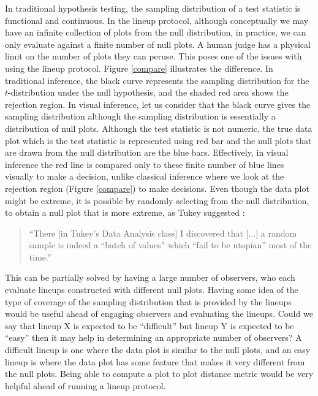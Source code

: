 \documentclass[12]{article}
\begin{document}
In traditional hypothesis testing, the sampling distribution of a test statistic is functional and continuous. In the lineup protocol, although conceptually we may have an infinite collection of plots from the null distribution, in practice, we can only evaluate against a finite number of null plots. A human judge has a physical limit on the number of plots they can peruse. This poses one of the issues with using the lineup protocol.  Figure \ref{compare} illustrates the difference. In traditional inference, the black curve represents the sampling distribution for the $t$-distribution under the null hypothesis, and the shaded red area shows the rejection region. In visual inference, let us consider that the black curve gives the sampling distribution although the sampling distribution is essentially a distribution of null plots. Although the test statistic is not numeric, the true data plot which is the test statistic is represented using red bar and the null plots that are drawn from the null distribution are the blue bars. %
Effectively,  in visual inference the red line is compared only to these finite number of blue lines visually to make a decision, unlike classical inference where we look at the rejection region (Figure \ref{compare}) to make decisions. Even though the data plot might be extreme, it is possible by randomly selecting from the null distribution, to obtain a null plot that is more extreme, as Tukey suggested \citep{fernholz03}:

\begin{quotation}
``There [in Tukey's Data Analysis class] I discovered that [...]  a random sample is indeed a ``batch of values'' which ``fail to be utopian'' most of the time.''
\end{quotation}



This can be partially solved by having a large number of observers, who each evaluate lineups constructed with different null plots. Having some idea of the type of coverage of the sampling distribution that is provided by the lineups would be useful ahead of engaging observers and evaluating the lineups. Could we say that lineup X is expected to be ``difficult'' but lineup Y is expected to be ``easy'' then it may help in determining an appropriate number of observers? A difficult lineup is one where the data plot is similar to the null plots, and an easy lineup is where the data plot has some feature that makes it very different from the null plots. Being able to compute a plot to plot distance metric would be very helpful ahead of running a lineup protocol.
\end{document}
